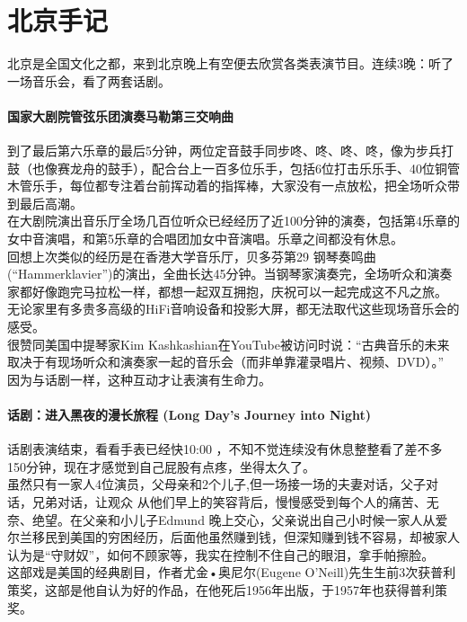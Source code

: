 \chapter{北京手记} %



北京是全国文化之都，来到北京晚上有空便去欣赏各类表演节目。连续3晚：听了一场音乐会，看了两套话剧。

\hypertarget{ux56fdux5bb6ux5927ux5267ux9662ux7ba1ux5f26ux4e50ux56e2ux6f14ux594fux9a6cux52d2ux7b2cux4e09ux4ea4ux54cdux66f2}{%
\subsubsection{国家大剧院管弦乐团演奏马勒第三交响曲}\label{ux56fdux5bb6ux5927ux5267ux9662ux7ba1ux5f26ux4e50ux56e2ux6f14ux594fux9a6cux52d2ux7b2cux4e09ux4ea4ux54cdux66f2}}

到了最后第六乐章的最后5分钟，两位定音鼓手同步咚、咚、咚、咚，像为步兵打鼓（也像赛龙舟的鼓手），配合台上一百多位乐手，包括6位打击乐乐手、40位铜管木管乐手，每位都专注着台前挥动着的指挥棒，大家没有一点放松，把全场听众带到最后高潮。\\
在大剧院演出音乐厅全场几百位听众已经经历了近100分钟的演奏，包括第4乐章的女中音演唱，和第5乐章的合唱团加女中音演唱。乐章之间都没有休息。\\
回想上次类似的经历是在香港大学音乐厅，贝多芬第29
钢琴奏鸣曲(``Hammerklavier'')的演出，全曲长达45分钟。当钢琴家演奏完，全场听众和演奏家都好像跑完马拉松一样，都想一起双互拥抱，庆祝可以一起完成这不凡之旅。\\
无论家里有多贵多高级的HiFi音响设备和投影大屏，都无法取代这些现场音乐会的感受。\\
很赞同美国中提琴家Kim
Kashkashian在YouTube被访问时说：``古典音乐的未来取决于有现场听众和演奏家一起的音乐会（而非单靠灌录唱片、视频、DVD）。''\\
因为与话剧一样，这种互动才让表演有生命力。

\hypertarget{ux8bddux5267ux8fdbux5165ux9ed1ux591cux7684ux6f2bux957fux65c5ux7a0b-long-days-journey-into-night}{%
\subsubsection{话剧：进入黑夜的漫长旅程 (Long Day's Journey into
Night)}\label{ux8bddux5267ux8fdbux5165ux9ed1ux591cux7684ux6f2bux957fux65c5ux7a0b-long-days-journey-into-night}}

话剧表演结束，看看手表已经快10:00
，不知不觉连续没有休息整整看了差不多150分钟，现在才感觉到自己屁股有点疼，坐得太久了。\\
虽然只有一家人4位演员，父母亲和2个儿子,但一场接一场的夫妻对话，父子对话，兄弟对话，让观众
从他们早上的笑容背后，慢慢感受到每个人的痛苦、无奈、绝望。在父亲和小儿子Edmund
晚上交心，父亲说出自己小时候一家人从爱尔兰移民到美国的穷困经历，后面他虽然赚到钱，但深知赚到钱不容易，却被家人认为是``守财奴''，如何不顾家等，我实在控制不住自己的眼泪，拿手帕擦脸。\\
这部戏是美国的经典剧目，作者尤金•奥尼尔(Eugene
O'Neill)先生生前3次获普利策奖，这部是他自认为好的作品，在他死后1956年出版，于1957年也获得普利策奖。

